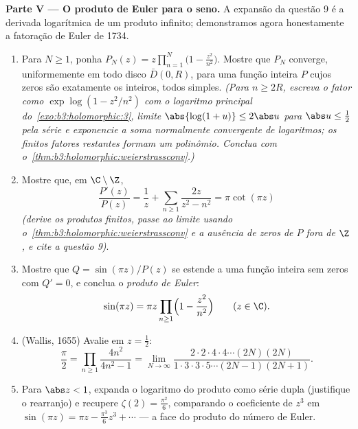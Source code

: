 \begin{problem}
\medskip
\noindent\textbf{Parte V --- O produto de Euler para o seno.} A
expansão da questão 9 é a derivada logarítmica de um produto infinito;
demonstramos agora honestamente a fatoração de Euler de 1734.
\begin{enumerate}[resume]
  \item Para $N \geq 1$, ponha $P_N(z) =
        z\prod_{n=1}^{N}\bigl(1 - \frac{z^2}{n^2}\bigr)$. Mostre que $P_N$ converge,
        uniformemente em todo disco $\bar D(0, R)$, para uma função inteira
        $P$ cujos zeros são exatamente os inteiros, todos simples.
        \emph{(Para $n
        \geq 2R$, escreva o fator como $\exp\log(1 -
        z^2/n^2)$ com o logaritmo
        principal do~\cref{exo:b3:holomorphic:3}, limite $\abs{\log(1+u)}
        \leq 2\abs u$ para $\abs u \leq \frac12$ pela série
        e exponencie a soma normalmente convergente de logaritmos; os
        finitos fatores restantes formam um polinômio. Conclua com
        o~\cref{thm:b3:holomorphic:weierstrassconv}.)}
  \item Mostre que, em $\C\setminus\Z$,
        \[
        \frac{P'(z)}{P(z)} = \frac1z +
        \sum_{n\geq1}\frac{2z}{z^2 - n^2} = \pi\cot(\pi z)
        \]
        \emph{(derive os produtos finitos, passe ao limite usando
        o~\cref{thm:b3:holomorphic:weierstrassconv} e a ausência de zeros de $P$ fora de
        $\Z$, e cite a questão 9)}.
  \item Mostre que $Q = \sin(\pi z)/P(z)$ se estende a uma função inteira sem zeros com
        $Q' = 0$, e conclua o \emph{produto de Euler}:
        \[
        \sin(\pi z) = \pi z\prod_{n\geq1}
        \Bigl(1 - \frac{z^2}{n^2}\Bigr)
        \qquad (z \in \C) .
        \]
  \item (Wallis, 1655) Avalie em $z = \frac12$:
        \[
        \frac\pi2 = \prod_{n\geq1}\frac{4n^2}{4n^2 - 1}
        = \lim_{N\to\infty}
        \frac{2\cdot2\cdot4\cdot4\cdots(2N)(2N)}
        {1\cdot3\cdot3\cdot5\cdots(2N-1)(2N+1)} .
        \]
  \item Para $\abs z < 1$, expanda o logaritmo do produto como série dupla
        (justifique o rearranjo) e recupere $\zeta(2) =
        \frac{\pi^2}6$, comparando o
        coeficiente de $z^3$ em $\sin(\pi z) = \pi z - \frac{\pi^3}6z^3 + \cdots$ --- a face do produto do número
        de Euler.
\end{enumerate}


\end{problem}
